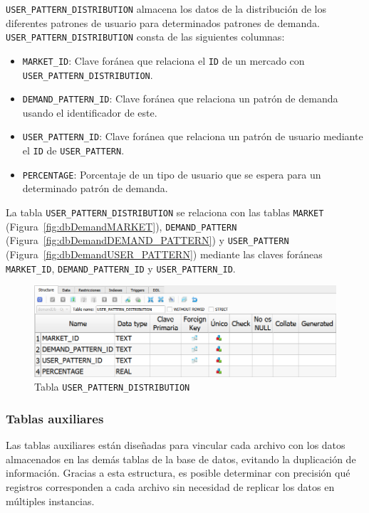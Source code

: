\texttt{USER\_PATTERN\_DISTRIBUTION} almacena los datos de la distribución de los diferentes patrones de usuario para determinados patrones de demanda. \texttt{USER\_PATTERN\_DISTRIBUTION} consta de las siguientes columnas:
\begin{itemize}
    \item \texttt{MARKET\_ID}: Clave foránea que relaciona el \texttt{ID} de un mercado con \texttt{USER\_PATTERN\_DISTRIBUTION}.
    \item \texttt{DEMAND\_PATTERN\_ID}: Clave foránea que relaciona un patrón de demanda usando el identificador de este.
    \item \texttt{USER\_PATTERN\_ID}: Clave foránea que relaciona un patrón de usuario mediante el \texttt{ID} de \texttt{USER\_PATTERN}. 
    \item \texttt{PERCENTAGE}: Porcentaje de un tipo de usuario que se espera para un determinado patrón de demanda.
\end{itemize}
La tabla \texttt{USER\_PATTERN\_DISTRIBUTION} se relaciona con las tablas \texttt{MARKET} (Figura~\ref{fig:dbDemandMARKET}), \texttt{DEMAND\_PATTERN} (Figura~\ref{fig:dbDemandDEMAND_PATTERN}) y \texttt{USER\_PATTERN} (Figura~\ref{fig:dbDemandUSER_PATTERN}) mediante las claves foráneas \texttt{MARKET\_ID}, \texttt{DEMAND\_PATTERN\_ID} y \texttt{USER\_PATTERN\_ID}.

\begin{figure}[H]
\centering
\includegraphics[width=.9\textwidth]{fig/Tablas base de datos/Demanda/USER_PATTERN_DISTRIBUTION.png}
\caption{Tabla \texttt{USER\_PATTERN\_DISTRIBUTION}}
\label{fig:dbDemandUSER_PATTERN_DISTRIBUTION}
\end{figure}

\subsubsection{Tablas auxiliares}

Las tablas auxiliares están diseñadas para vincular cada archivo con los datos almacenados en las demás tablas de la base de datos, evitando la duplicación de información. Gracias a esta estructura, es posible determinar con precisión qué registros corresponden a cada archivo sin necesidad de replicar los datos en múltiples instancias.


